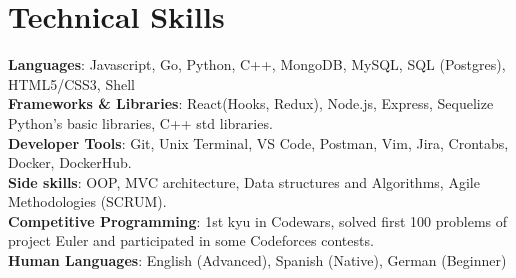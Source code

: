 \documentclass[letterpaper,11pt]{article}
\newcommand{\resumeSubHeadingListEnd}{\end{itemize}}
\begin{document}



%
\section{Technical Skills}
 \begin{itemize}[leftmargin=0.15in, label={}]
    \small{\item{
     \textbf{Languages}{: Javascript, Go, Python, C++, MongoDB, MySQL, SQL (Postgres), HTML5/CSS3, Shell} \\
     \textbf{Frameworks \& Libraries}{: React(Hooks, Redux), Node.js, Express, Sequelize Python's basic libraries, C++ std libraries.} \\
     \textbf{Developer Tools}{: Git, Unix Terminal, VS Code, Postman, Vim, Jira, Crontabs, Docker, DockerHub.}\\
     \textbf{Side skills}{: OOP, MVC architecture, Data structures and Algorithms, Agile Methodologies (SCRUM).}\\
    \textbf{Competitive Programming}{: 1st kyu in Codewars, solved first 100 problems of project Euler and participated in some Codeforces contests.}\\
    \textbf{Human Languages}{: English (Advanced), Spanish (Native), German (Beginner)}\\
        }}
 \end{itemize}
\end{document}
